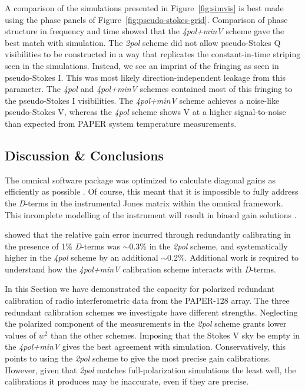 A comparison of the simulations presented in Figure~\ref{fig:simvis} is best made using the phase panels of Figure~\ref{fig:pseudo-stokes-grid}. Comparison of phase structure in frequency and time showed that the \textit{4pol+minV} scheme gave the best match with simulation. The \textit{2pol} scheme did not allow pseudo-Stokes Q visibilities to be constructed in a way that replicates the constant-in-time striping seen in the simulations. Instead, we see an imprint of the fringing as seen in pseudo-Stokes I. This was most likely direction-independent leakage from this parameter. The \textit{4pol} and \textit{4pol+minV} schemes contained most of this fringing to the pseudo-Stokes I visibilities. The \textit{4pol+minV} scheme achieves a noise-like pseudo-Stokes V, whereas the \textit{4pol} scheme shows V at a higher signal-to-noise than expected from PAPER system temperature measurements.

\subsection{Discussion \& Conclusions}
\label{sec:polcal_disc}

The {\sc omnical} software package was optimized to calculate diagonal gains as efficiently as possible \citep{Zheng.14}. Of course, this meant that it is impossible to fully address the \textit{D}-terms in the instrumental Jones matrix \citep[e.g.][]{TMS} within the {\sc omnical} framework. This incomplete modelling of the instrument will result in biased gain solutions \citep[e.g.][]{Barry.16, Dillon.17}. 

\cite{Dillon.17} showed that the relative gain error incurred through redundantly calibrating in the presence of 1\% \textit{D}-terms was $\sim$0.3\% in the \textit{2pol} scheme, and systematically higher in the \textit{4pol} scheme by an additional $\sim$0.2\%. Additional work is required to understand how the \textit{4pol+minV} calibration scheme interacts with \textit{D}-terms.

In this Section we have demonstrated the capacity for polarized redundant calibration of radio interferometric data from the PAPER-128 array. The three redundant calibration schemes we investigate have different strengths. Neglecting the polarized component of the measurements in the \textit{2pol} scheme grants lower values of $w^2$ than the other schemes. 
Imposing that the Stokes V sky be empty in the \textit{4pol+minV} gives the best agreement with simulation. Conservatively, this points to using the \textit{2pol} scheme to give the most precise gain calibrations. However, given that \textit{2pol} matches full-polarization simulations the least well, the calibrations it produces may be inaccurate, even if they are precise. 

